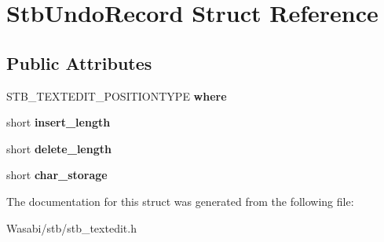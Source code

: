 \hypertarget{struct_stb_undo_record}{}\section{Stb\+Undo\+Record Struct Reference}
\label{struct_stb_undo_record}
\subsection*{Public Attributes}
\begin{DoxyCompactItemize}
\item 
S\+T\+B\+\_\+\+T\+E\+X\+T\+E\+D\+I\+T\+\_\+\+P\+O\+S\+I\+T\+I\+O\+N\+T\+Y\+PE {\bfseries where}\hypertarget{struct_stb_undo_record_a49e87adbb75a18ffba1f853ac974b31d}{}\label{struct_stb_undo_record_a49e87adbb75a18ffba1f853ac974b31d}

\item 
short {\bfseries insert\+\_\+length}\hypertarget{struct_stb_undo_record_ae2a3af79db791549db0c42263407cab5}{}\label{struct_stb_undo_record_ae2a3af79db791549db0c42263407cab5}

\item 
short {\bfseries delete\+\_\+length}\hypertarget{struct_stb_undo_record_ad81789175cef417a0fe58204277fd735}{}\label{struct_stb_undo_record_ad81789175cef417a0fe58204277fd735}

\item 
short {\bfseries char\+\_\+storage}\hypertarget{struct_stb_undo_record_a654ca22cb5021a8ee18ad5f500eb406d}{}\label{struct_stb_undo_record_a654ca22cb5021a8ee18ad5f500eb406d}

\end{DoxyCompactItemize}


The documentation for this struct was generated from the following file\+:\begin{DoxyCompactItemize}
\item 
Wasabi/stb/stb\+\_\+textedit.\+h\end{DoxyCompactItemize}

